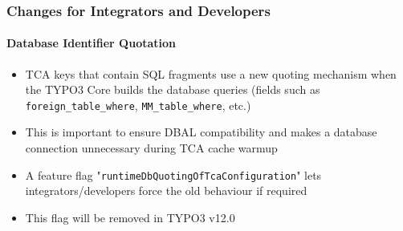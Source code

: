 %

\begin{frame}[fragile]
	\frametitle{Changes for Integrators and Developers}
	\framesubtitle{Database Identifier Quotation}


	\begin{itemize}
		\item TCA keys that contain SQL fragments use a new quoting mechanism
			when the TYPO3 Core builds the database queries\newline
			\small(fields such as \texttt{foreign\_table\_where}, \texttt{MM\_table\_where}, etc.)\normalsize
		\item This is important to ensure DBAL compatibility and makes a
			database connection unnecessary during TCA cache warmup
		\item A feature flag "\texttt{runtimeDbQuotingOfTcaConfiguration}" lets
		 	integrators/developers force the old behaviour if required
		\item This flag will be removed in TYPO3 v12.0
	\end{itemize}

\end{frame}

